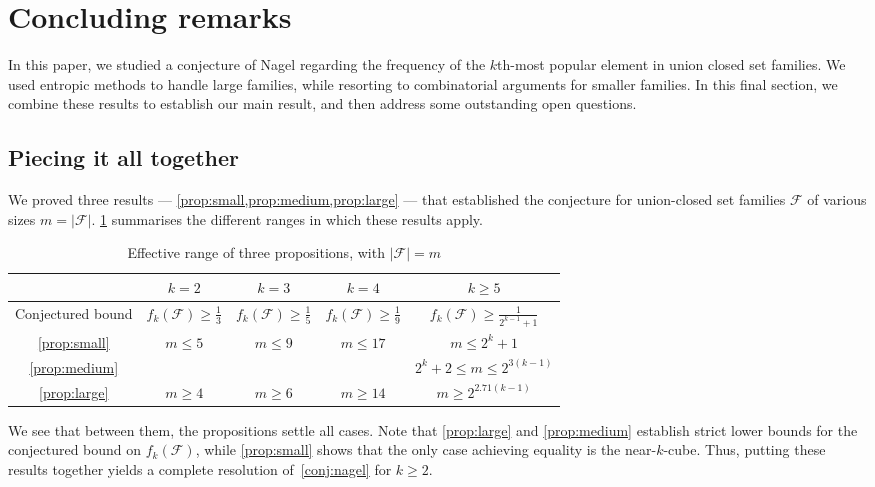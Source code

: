 \documentclass[a4paper,12pt]{article}
\theoremstyle{mystyle}	%
\theoremstyle{definition}
\newcommand{\F}{\mathcal{F}}
\newcommand{\6}{\partial}
\begin{document}
\section{Concluding remarks} \label{sec:conclusion}

In this paper, we studied a conjecture of Nagel regarding the frequency of the $k$th-most popular element in union closed set families. We used entropic methods to handle large families, while resorting to combinatorial arguments for smaller families. In this final section, we combine these results to establish our main result, and then address some outstanding open questions.

\subsection{Piecing it all together}

We proved three results --- \cref{prop:small,prop:medium,prop:large} --- that established the conjecture for union-closed set families $\F$ of various sizes $m = |\F|$. \cref{tab:range} summarises the different ranges in which these results apply.

\begin{table}[htbp!]
    \centering
    \begin{tabular}{c|c|c|c|c}
        & $k = 2$ & $k = 3$ & $k = 4$ & $k \geq 5$ \\ \hline
        Conjectured bound & $f_k(\mathcal{F})\geq\frac13$ & $f_k(\mathcal{F})\geq\frac15$ & $f_k(\mathcal{F})\geq\frac19$ & $f_k(\mathcal{F})\geq\frac1{2^{k-1}+1}$\\ \hline
        \cref{prop:small}& $m\leq 5$ & $m\leq 9$ & $m\leq 17$ & $ m \le 2^k + 1$ \\
        \cref{prop:medium}&  &  &  & $2^k + 2 \leq m \leq 2^{3(k-1)}$ \\
        \cref{prop:large}& $m\geq 4$ & $m\geq 6$ & $m\geq 14$ & $m \geq 2^{2.71(k-1)}$ \\
    \end{tabular}
    \caption{Effective range of three propositions, with $|\mathcal{F}|=m$}
    \label{tab:range}
\end{table}

We see that between them, the propositions settle all cases. Note that \cref{prop:large} and \cref{prop:medium} establish strict lower bounds for the conjectured bound on $f_k(\F)$, while \cref{prop:small} shows that the only case achieving equality is the near-$k$-cube. Thus, putting these results together yields a complete resolution of~\cref{conj:nagel} for $k \ge 2$.
\end{document}
